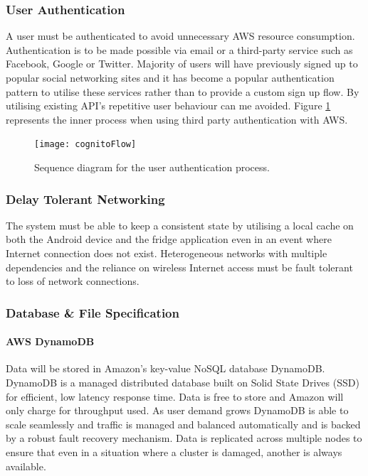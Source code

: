 \documentclass[a4paper, 11pt]{article}
\begin{document}
\subsubsection {User Authentication}
A user must be authenticated to avoid unnecessary AWS resource consumption. Authentication is to be made possible via email or a third-party service such as Facebook, Google or Twitter. Majority of users will have previously signed up to popular social networking sites and it has become a popular authentication pattern to utilise these services rather than to provide a custom sign up flow. By utilising existing API's repetitive user behaviour can me avoided. Figure \ref{fig:cognitoFlow} represents the inner process when using third party authentication with AWS.

\vspace{\baselineskip}
\vspace{\baselineskip}

\begin{figure}[!hp]
\centering
\texttt{[image: cognitoFlow]}
\caption{Sequence diagram for the user authentication process.} \label{fig:cognitoFlow}
\end{figure}


\subsubsection {Delay Tolerant Networking}
The system must be able to keep a consistent state by utilising a local cache on both the Android device and the fridge application even in an event where Internet connection does not exist. Heterogeneous networks with multiple dependencies and the reliance on wireless Internet access must be fault tolerant to loss of network connections.


\subsubsection {Database \& File Specification}
\paragraph{AWS DynamoDB}Data will be stored in Amazon's key-value NoSQL database DynamoDB. DynamoDB is a managed distributed database built on Solid State Drives (SSD) for efficient, low latency response time. Data is free to store and Amazon will only charge for throughput used. As user demand grows DynamoDB is able to scale seamlessly and traffic is managed and balanced automatically and is backed by a robust fault recovery mechanism. Data is replicated across multiple nodes to ensure that even in a situation where a cluster is damaged, another is always available. 
\end{document}
